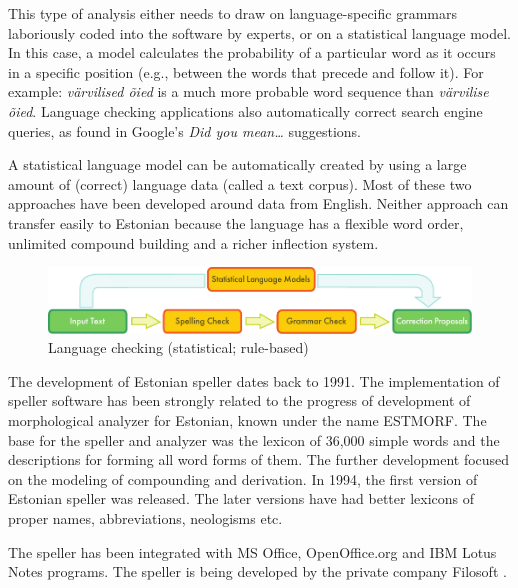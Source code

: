 \documentclass[]{../metanetpaper}
\begin{document}
\begin{multicols}{2}
This type of analysis either needs to draw on language-specific grammars laboriously coded into the software by experts, or on a statistical language model. 
In this case, a model calculates the probability of a particular word as it occurs in a specific position (e.g., between the words that precede and follow it). 
For example: \textit{värvilised õied} is a much more probable word sequence than \textit{värvilise õied}.
Language checking applications also automatically correct search engine queries, as found in Google's \textit{Did you mean…} suggestions.

A statistical language model can be automatically created by using a large amount of (correct) language data (called a text corpus). 
Most of these two approaches have been developed around data from English. 
Neither approach can transfer easily to Estonian because the language has a flexible word order, unlimited compound building and a richer inflection system. 

\begin{figure}[htb]
  \center
  \includegraphics[width=\textwidth]{../_media/english/language_checking}
  \caption{Language checking (statistical; rule-based)}
  \label{fig:langcheckingaarch_en}
\end{figure}


The development of Estonian speller dates back to 1991. 
The implementation of speller software has been strongly related to the progress of development of morphological analyzer for Estonian, known under the name ESTMORF. 
The base for the speller and analyzer was the lexicon of 36,000 simple words and the descriptions for forming all word forms of them. 
The further development focused on the modeling of compounding and derivation.
In 1994, the first version of Estonian speller was released. 
The later versions have had better lexicons of proper names, abbreviations, neologisms etc.

The speller has been integrated with MS Office, OpenOffice.org and IBM Lotus Notes programs. The speller is being developed by the private company Filosoft \cite{Filosoft}.


\end{multicols}
\end{document}
